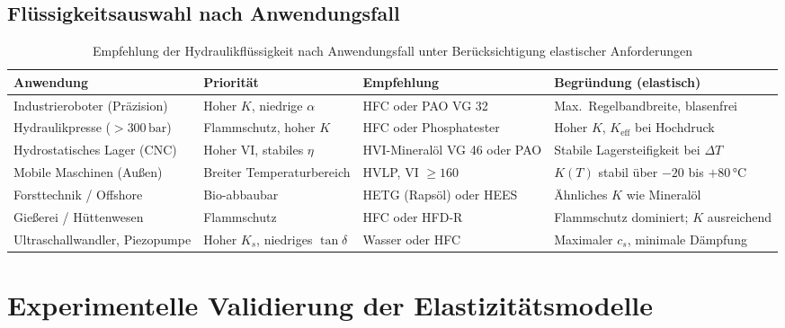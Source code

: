﻿\documentclass[a4paper,12pt]{scrreprt}
\theoremstyle{definition}
\begin{document}
\subsection{Flüssigkeitsauswahl nach Anwendungsfall}

\begin{table}[H]
  \centering
  \caption{Empfehlung der Hydraulikflüssigkeit nach Anwendungsfall
    unter Berücksichtigung elastischer Anforderungen}
  \label{tab:fluid_auswahl}
  \begin{tabular}{p{3.5cm}p{2.5cm}p{3.0cm}p{3.5cm}}
    \toprule
    \textbf{Anwendung}
      & \textbf{Priorität}
      & \textbf{Empfehlung}
      & \textbf{Begründung (elastisch)} \\
    \midrule
    Industrieroboter (Präzision)
      & Hoher $K$, niedrige $\alpha$
      & HFC oder PAO VG 32
      & Max.\ Regelbandbreite, blasenfrei \\[4pt]
    Hydraulikpresse ($> 300\,\mathrm{bar}$)
      & Flammschutz, hoher $K$
      & HFC oder Phosphatester
      & Hoher $K$, $K_{\mathrm{eff}}$ bei Hochdruck \\[4pt]
    Hydrostatisches Lager (CNC)
      & Hoher VI, stabiles $\eta$
      & HVI-Mineralöl VG 46 oder PAO
      & Stabile Lagersteifigkeit bei $\Delta T$ \\[4pt]
    Mobile Maschinen (Außen)
      & Breiter Temperaturbereich
      & HVLP, VI $\geq 160$
      & $K(T)$ stabil über $-20$ bis $+80\, °\mathrm{C}$ \\[4pt]
    Forsttechnik / Offshore
      & Bio-abbaubar
      & HETG (Rapsöl) oder HEES
      & Ähnliches $K$ wie Mineralöl \\[4pt]
    Gießerei / Hüttenwesen
      & Flammschutz
      & HFC oder HFD-R
      & Flammschutz dominiert; $K$ ausreichend \\[4pt]
    Ultraschallwandler, Piezopumpe
      & Hoher $K_s$, niedriges $\tan\delta$
      & Wasser oder HFC
      & Maximaler $c_s$, minimale Dämpfung \\
    \bottomrule
  \end{tabular}
\end{table}

\section{Experimentelle Validierung der Elastizitätsmodelle}
\label{sec:experimente}
\end{document}
